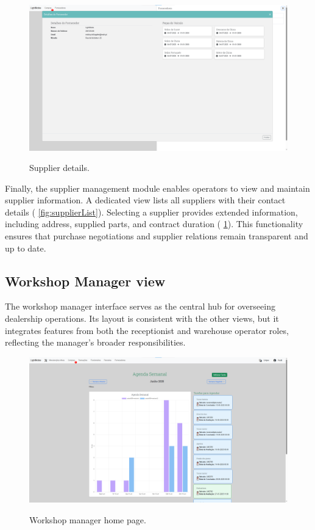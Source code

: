 \begin{figure}[h]
  \caption{Supplier details.}
  \centering
  \includegraphics[width=\textwidth]{figs/Implementation/warehouse/supplierDetails}
  \label{fig:supplierDetails}
\end{figure}



Finally, the supplier management module enables operators to view and maintain supplier information. A dedicated view lists all suppliers with their contact details ( \ref{fig:supplierList}). Selecting a supplier provides extended information, including address, supplied parts, and contract duration ( \ref{fig:supplierDetails}). This functionality ensures that purchase negotiations and supplier relations remain transparent and up to date.

\subsection{Workshop Manager view}


The workshop manager interface serves as the central hub for overseeing dealership operations. Its layout is consistent with the other views, but it integrates features from both the receptionist and warehouse operator roles, reflecting the manager's broader responsibilities.


\begin{figure}[h]
  \caption{Workshop manager home page.}
  \centering
  \includegraphics[width=\textwidth]{figs/Implementation/workshopmanager/homePage}
  \label{fig:workshopmanagerHomePage}
\end{figure}

